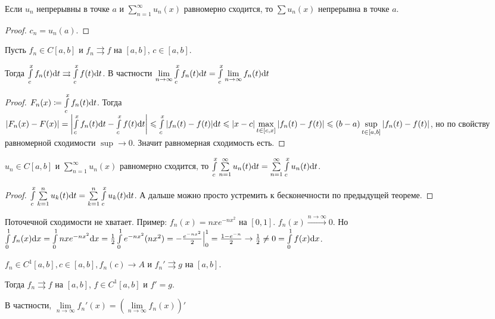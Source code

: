 \begin{consequence}
    Если $u_n$ непрерывны в точке  $a$ и  $\sum\limits_{n=1}^\infty u_n(x)$ равномерно сходится, то  $\sum u_n(x)$ непрерывна в точке  $a$.
\end{consequence}
\begin{proof}
    $c_n = u_n(a)$.
\end{proof}
\begin{theorem}
    Пусть $f_n \in C[a, b]$ и  $f_n \rightrightarrows f$ на  $[a, b]$, $c \in [a,b]$.

    Тогда $\int\limits_c^x f_n(t)\mathrm{d}t \rightrightarrows \int\limits_c^x f(t)\mathrm{d}t$. В частности $\lim\limits_{n \to \infty} \int\limits_c^x f_n(t)\mathrm{d}t = \int\limits_c^x \lim\limits_{n \to \infty} f_n(t)\mathrm{d}t$

\end{theorem}
\begin{proof}
    $F_n(x) \coloneqq \int\limits_c^x f_n(t) \mathrm{d}t$. Тогда  $|F_n(x) - F(x)| = \left|\int\limits_c^xf_n(t)\mathrm{d}t - \int\limits_c^x f(t)\mathrm{d}t\right| \leqslant \int\limits_c^x |f_n(t) - f(t)| \mathrm{d}t \leqslant |x-c|\max\limits_{t \in [c, x]} |f_n(t) - f(t)| \leqslant (b-a)\sup\limits_{t \in [a, b]} |f_n(t) - f(t)|$, но по свойству равномерной сходимости $\sup \to 0$. Значит равномерная сходимость есть.
\end{proof}
\begin{consequence}
    $u_n \in C[a, b]$ и  $\sum\limits_{n=1}^\infty u_n(x)$ равномерно сходится, то $\int\limits_c^x \sum\limits_{n=1}^\infty u_n(t)\mathrm{d}t = \sum\limits_{n=1}^\infty \int\limits_c^x u_n(t)\mathrm{d}t$.
\end{consequence}
\begin{proof}
    $\int\limits_c^x\sum\limits_{k=1}^n u_k(t)\mathrm{d}t = \sum\limits_{k=1}^n \int\limits_c^x u_k(t)\mathrm{d}t$. А дальше можно просто устремить к бесконечности по предыдущей теореме.
\end{proof}
\begin{remark}
    Поточечной сходимости не хватает. Пример: $f_n(x) = nxe^{-nx^2}$ на  $[0, 1]$.  $f_n(x) \xrightarrow{n \to \infty} 0$. Но $\int\limits_0^1 f_n(x) \mathrm{d}x = \int\limits_0^1 nxe^{-nx^2}\mathrm{d}x = \frac{1}{2} \int\limits_0^1 e^{-nx^2} \mathrm(nx^2) = -\frac{e^{-nx^2}}{2} \Big|_0^1 = \frac{1-e^{-n}}{2} \to \frac{1}{2} \neq 0 = \int\limits_0^1 f(x)\mathrm{d}x$.
\end{remark}
\begin{theorem}
    $f_n \in C^1[a, b], c \in [a, b], f_n(c) \to A$ и  $f_n' \rightrightarrows g$ на $[a, b]$. 
    
    Тогда  $f_n \rightrightarrows f$ на  $[a, b]$,  $f \in C^1[a, b]$ и $f' = g$.

    В частности, $\lim\limits_{n \to \infty} f_n'(x) = (\lim\limits_{n \to \infty} f_n(x))'$
\end{theorem}
